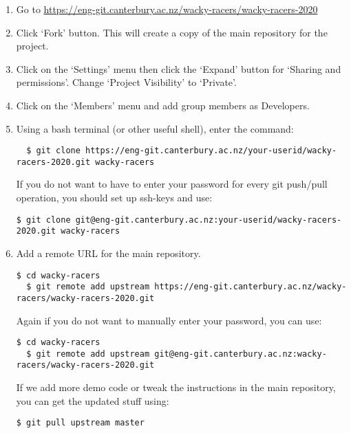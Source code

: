 \documentclass[11pt, a4paper]{article}
\begin{document}
\begin{enumerate}
\item Go to \url{https://eng-git.canterbury.ac.nz/wacky-racers/wacky-racers-2020}

\item Click `Fork' button.  This will create a copy of the main repository for the project.

\item Click on the `Settings' menu then click the `Expand' button for
`Sharing and permissions'.  Change `Project Visibility' to `Private'.

\item Click on the `Members' menu and add group members as Developers.

\item Using a bash terminal (or other useful shell), enter the command:

  \lstset{language=bash}
  \lstset{basicstyle=\ttfamily\small}
  \lstset{breaklines}
  
\begin{lstlisting}
  $ git clone https://eng-git.canterbury.ac.nz/your-userid/wacky-racers-2020.git wacky-racers
\end{lstlisting}

If you do not want to have to enter your password for every git
push/pull operation, you should set up ssh-keys and use:

\begin{lstlisting}[breaklines]
  $ git clone git@eng-git.canterbury.ac.nz:your-userid/wacky-racers-2020.git wacky-racers
\end{lstlisting}

\item Add a remote URL for the main repository.
%
\begin{lstlisting}[breaklines]
  $ cd wacky-racers 
  $ git remote add upstream https://eng-git.canterbury.ac.nz/wacky-racers/wacky-racers-2020.git  
\end{lstlisting}
%
Again if you do not want to manually enter your password, you can use:
%
\begin{lstlisting}[breaklines]
  $ cd wacky-racers 
  $ git remote add upstream git@eng-git.canterbury.ac.nz:wacky-racers/wacky-racers-2020.git    
\end{lstlisting}
%
If we add more demo code or tweak the instructions in the main
repository, you can get the updated stuff using:
%
\begin{lstlisting}[breaklines]
  $ git pull upstream master
\end{lstlisting}
\end{enumerate}
\end{document}
